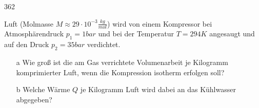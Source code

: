 \begin{auf}
    362
\end{auf}
Luft (Molmasse $M\approx29\cdot10^{-3}\frac{kg}{mol}$) wird von einem Kompressor bei Atmosphärendruck $p_1=1bar$ und bei der Temperatur $T=294K$ angesaugt und auf den Druck $p_2=35bar$ verdichtet.
\begin{enumerate}
    \item[a] Wie groß ist die am Gas verrichtete Volumenarbeit je Kilogramm komprimierter Luft, wenn die Kompression isotherm erfolgen soll?
    \item[b] Welche Wärme $Q$ je Kilogramm Luft wird dabei an das Kühlwasser abgegeben?
\end{enumerate}